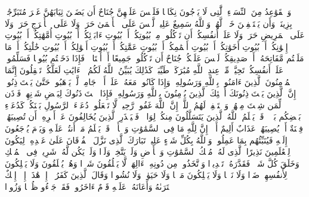 \startbuffer[\q:24:60]
وَٱلۡقَوَٰعِدُ مِنَ ٱلنِّسَاۤءِ ٱلَّٰتِی لَا یَرۡجُونَ نِكَاحࣰا فَلَیۡسَ عَلَیۡهِنَّ جُنَاحٌ أَن یَضَعۡنَ ثِیَابَهُنَّ غَیۡرَ مُتَبَرِّجَٰتِۭ بِزِینَةࣲۖ وَأَن یَسۡتَعۡفِفۡنَ خَیۡرࣱ لَّهُنَّۗ وَٱللَّهُ سَمِیعٌ عَلِیمࣱ%
\stopbuffer
\startbuffer[\q:24:61]
لَّیۡسَ عَلَى ٱلۡأَعۡمَىٰ حَرَجࣱ وَلَا عَلَى ٱلۡأَعۡرَجِ حَرَجࣱ وَلَا عَلَى ٱلۡمَرِیضِ حَرَجࣱ وَلَا عَلَىٰۤ أَنفُسِكُمۡ أَن تَأۡكُلُوا۟ مِنۢ بُیُوتِكُمۡ أَوۡ بُیُوتِ ءَابَاۤئِكُمۡ أَوۡ بُیُوتِ أُمَّهَٰتِكُمۡ أَوۡ بُیُوتِ إِخۡوَٰنِكُمۡ أَوۡ بُیُوتِ أَخَوَٰتِكُمۡ أَوۡ بُیُوتِ أَعۡمَٰمِكُمۡ أَوۡ بُیُوتِ عَمَّٰتِكُمۡ أَوۡ بُیُوتِ أَخۡوَٰلِكُمۡ أَوۡ بُیُوتِ خَٰلَٰتِكُمۡ أَوۡ مَا مَلَكۡتُم مَّفَاتِحَهُۥۤ أَوۡ صَدِیقِكُمۡۚ لَیۡسَ عَلَیۡكُمۡ جُنَاحٌ أَن تَأۡكُلُوا۟ جَمِیعًا أَوۡ أَشۡتَاتࣰاۚ فَإِذَا دَخَلۡتُم بُیُوتࣰا فَسَلِّمُوا۟ عَلَىٰۤ أَنفُسِكُمۡ تَحِیَّةࣰ مِّنۡ عِندِ ٱللَّهِ مُبَٰرَكَةࣰ طَیِّبَةࣰۚ كَذَٰلِكَ یُبَیِّنُ ٱللَّهُ لَكُمُ ٱلۡءَایَٰتِ لَعَلَّكُمۡ تَعۡقِلُونَ%
\stopbuffer
\startbuffer[\q:24:62]
إِنَّمَا ٱلۡمُؤۡمِنُونَ ٱلَّذِینَ ءَامَنُوا۟ بِٱللَّهِ وَرَسُولِهِۦ وَإِذَا كَانُوا۟ مَعَهُۥ عَلَىٰۤ أَمۡرࣲ جَامِعࣲ لَّمۡ یَذۡهَبُوا۟ حَتَّىٰ یَسۡتَءۡذِنُوهُۚ إِنَّ ٱلَّذِینَ یَسۡتَءۡذِنُونَكَ أُو۟لَٰۤئِكَ ٱلَّذِینَ یُؤۡمِنُونَ بِٱللَّهِ وَرَسُولِهِۦۚ فَإِذَا ٱسۡتَءۡذَنُوكَ لِبَعۡضِ شَأۡنِهِمۡ فَأۡذَن لِّمَن شِئۡتَ مِنۡهُمۡ وَٱسۡتَغۡفِرۡ لَهُمُ ٱللَّهَۚ إِنَّ ٱللَّهَ غَفُورࣱ رَّحِیمࣱ%
\stopbuffer
\startbuffer[\q:24:63]
لَّا تَجۡعَلُوا۟ دُعَاۤءَ ٱلرَّسُولِ بَیۡنَكُمۡ كَدُعَاۤءِ بَعۡضِكُم بَعۡضࣰاۚ قَدۡ یَعۡلَمُ ٱللَّهُ ٱلَّذِینَ یَتَسَلَّلُونَ مِنكُمۡ لِوَاذࣰاۚ فَلۡیَحۡذَرِ ٱلَّذِینَ یُخَالِفُونَ عَنۡ أَمۡرِهِۦۤ أَن تُصِیبَهُمۡ فِتۡنَةٌ أَوۡ یُصِیبَهُمۡ عَذَابٌ أَلِیمٌ%
\stopbuffer
\startbuffer[\q:24:64]
أَلَاۤ إِنَّ لِلَّهِ مَا فِی ٱلسَّمَٰوَٰتِ وَٱلۡأَرۡضِۖ قَدۡ یَعۡلَمُ مَاۤ أَنتُمۡ عَلَیۡهِ وَیَوۡمَ یُرۡجَعُونَ إِلَیۡهِ فَیُنَبِّئُهُم بِمَا عَمِلُوا۟ۗ وَٱللَّهُ بِكُلِّ شَیۡءٍ عَلِیمُۢ%
\stopbuffer
\startbuffer[\q:25:1]
تَبَارَكَ ٱلَّذِی نَزَّلَ ٱلۡفُرۡقَانَ عَلَىٰ عَبۡدِهِۦ لِیَكُونَ لِلۡعَٰلَمِینَ نَذِیرًا%
\stopbuffer
\startbuffer[\q:25:2]
ٱلَّذِی لَهُۥ مُلۡكُ ٱلسَّمَٰوَٰتِ وَٱلۡأَرۡضِ وَلَمۡ یَتَّخِذۡ وَلَدࣰا وَلَمۡ یَكُن لَّهُۥ شَرِیكࣱ فِی ٱلۡمُلۡكِ وَخَلَقَ كُلَّ شَیۡءࣲ فَقَدَّرَهُۥ تَقۡدِیرࣰا%
\stopbuffer
\startbuffer[\q:25:3]
وَٱتَّخَذُوا۟ مِن دُونِهِۦۤ ءَالِهَةࣰ لَّا یَخۡلُقُونَ شَیۡءࣰا وَهُمۡ یُخۡلَقُونَ وَلَا یَمۡلِكُونَ لِأَنفُسِهِمۡ ضَرࣰّا وَلَا نَفۡعࣰا وَلَا یَمۡلِكُونَ مَوۡتࣰا وَلَا حَیَوٰةࣰ وَلَا نُشُورࣰا%
\stopbuffer
\startbuffer[\q:25:4]
وَقَالَ ٱلَّذِینَ كَفَرُوۤا۟ إِنۡ هَٰذَاۤ إِلَّاۤ إِفۡكٌ ٱفۡتَرَىٰهُ وَأَعَانَهُۥ عَلَیۡهِ قَوۡمٌ ءَاخَرُونَۖ فَقَدۡ جَاۤءُو ظُلۡمࣰا وَزُورࣰا%
